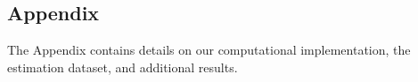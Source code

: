\begin{appendices}\setcounter{page}{1}
\renewcommand{\thepage}{\thesection-\arabic{page}}
\FloatBarrier\section{Appendix}\label{Appendix}
The Appendix contains details on our computational implementation, the estimation dataset, and additional results.







\newpage

\end{appendices}
